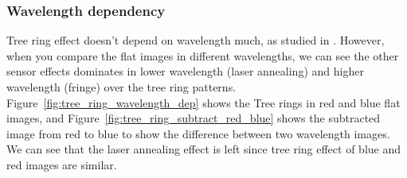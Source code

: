 \subsubsection{Wavelength dependency}
Tree ring effect doesn't depend on wavelength much, as studied in \citep{2017Jinst..12C05015,2020JATIS...6a1005P}. However, when you compare the flat images in different wavelengths, we can see the other sensor effects dominates in lower wavelength (laser annealing) and higher wavelength (fringe) over the tree ring patterns. Figure~\ref{fig:tree_ring_wavelength_dep} shows the Tree rings in red and blue flat images, and Figure~\ref{fig:tree_ring_subtract_red_blue} shows the subtracted image from red to blue to show the difference between two wavelength images. We can see that the laser annealing effect is left since tree ring effect of blue and red images are similar. 

